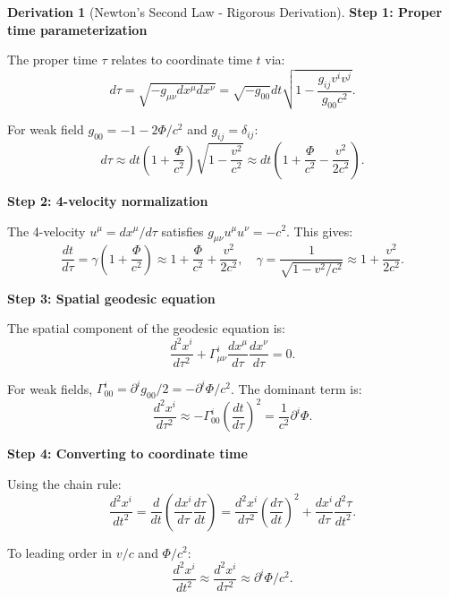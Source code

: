 \documentclass[12pt,a4paper]{article}
\theoremstyle{definition}
\newtheorem{derivation}{Derivation}[section]
\theoremstyle{remark}
\begin{document}
\begin{derivation}[Newton's Second Law - Rigorous Derivation]
\textbf{Step 1: Proper time parameterization}

The proper time $\tau$ relates to coordinate time $t$ via:
\begin{equation}
d\tau = \sqrt{-g_{\mu\nu} dx^\mu dx^\nu} = \sqrt{-g_{00}} dt \sqrt{1 - \frac{g_{ij} v^i v^j}{g_{00} c^2}}.
\end{equation}

For weak field $g_{00} = -1 - 2\Phi/c^2$ and $g_{ij} = \delta_{ij}$:
\begin{equation}
d\tau \approx dt \left(1 + \frac{\Phi}{c^2}\right) \sqrt{1 - \frac{v^2}{c^2}} \approx dt \left(1 + \frac{\Phi}{c^2} - \frac{v^2}{2c^2}\right).
\end{equation}

\textbf{Step 2: 4-velocity normalization}

The 4-velocity $u^\mu = dx^\mu/d\tau$ satisfies $g_{\mu\nu} u^\mu u^\nu = -c^2$. This gives:
\begin{equation}
\frac{dt}{d\tau} = \gamma \left(1 + \frac{\Phi}{c^2}\right) \approx 1 + \frac{\Phi}{c^2} + \frac{v^2}{2c^2}, \quad \gamma = \frac{1}{\sqrt{1-v^2/c^2}} \approx 1 + \frac{v^2}{2c^2}.
\end{equation}

\textbf{Step 3: Spatial geodesic equation}

The spatial component of the geodesic equation is:
\begin{equation}
\frac{d^2 x^i}{d\tau^2} + \Gamma^i_{\mu\nu} \frac{dx^\mu}{d\tau} \frac{dx^\nu}{d\tau} = 0.
\end{equation}

For weak fields, $\Gamma^i_{00} = \partial^i g_{00}/2 = -\partial^i \Phi/c^2$. The dominant term is:
\begin{equation}
\frac{d^2 x^i}{d\tau^2} \approx -\Gamma^i_{00} \left(\frac{dt}{d\tau}\right)^2 = \frac{1}{c^2} \partial^i \Phi.
\end{equation}

\textbf{Step 4: Converting to coordinate time}

Using the chain rule:
\begin{equation}
\frac{d^2 x^i}{dt^2} = \frac{d}{dt}\left(\frac{dx^i}{d\tau} \frac{d\tau}{dt}\right) = \frac{d^2 x^i}{d\tau^2} \left(\frac{d\tau}{dt}\right)^2 + \frac{dx^i}{d\tau} \frac{d^2\tau}{dt^2}.
\end{equation}

To leading order in $v/c$ and $\Phi/c^2$:
\begin{equation}
\frac{d^2 x^i}{dt^2} \approx \frac{d^2 x^i}{d\tau^2} \approx \partial^i \Phi/c^2.
\end{equation}


\end{derivation}
\end{document}
